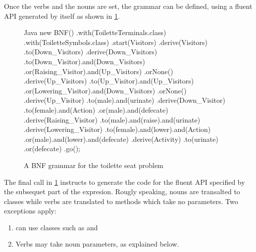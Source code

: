 Once the verbs and the nouns are set, the grammar can be defined,
  using a fluent API generated by \SELF itself as shown
  in \cref{Figure:fluent}.

\begin{figure}[htbp]
  \scriptsize
  \begin{code}{Java}
new BNF()
  .with(ToiletteTerminals.class)
  .with(ToiletteSymbols.class)
  .start(Visitors)
  .derive(Visitors)
    .to(Down_Visitors)
  .derive(Down_Visitors)
    .to(Down_Visitor).and(Down_Visitors)
    .or(Raising_Visitor).and(Up_Visitors)
    .orNone()
  .derive(Up_Visitors)
    .to(Up_Visitor).and(Up_Visitors)
    .or(Lowering_Visitor).and(Down_Visitors)
    .orNone()
  .derive(Up_Visitor)
    .to(male).and(urinate)
  .derive(Down_Visitor)
    .to(female).and(Action)
    .or(male).and(defecate)
  .derive(Raising_Visitor)
    .to(male).and(raise).and(urinate)
  .derive(Lowering_Visitor)
    .to(female).and(lower).and(Action)
    .or(male).and(lower).and(defecate)
  .derive(Activity)
    .to(urinate)
    .or(defecate)
  .go();
  \end{code}
  \caption{A BNF grammar for the toilette seat problem}
  \label{Figure:fluent}
\end{figure}

The final call  in \cref{Figure:fluent} instructs
  \SELF to generate the code for the fluent API specified by the
  subsequet part of the expresion.
Rougly speaking, nouns are transalted to classes while verbs are translated to methods which
  take no parameters.
Two exceptions apply:
\begin{enumerate}
  \item \SELF can use classes such as  and 
  \item Verbs may take noun parameters, as explained below.
\end{enumerate}
